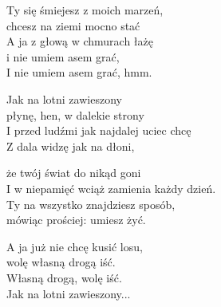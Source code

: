 \begin{text}
    Ty się śmiejesz z moich marzeń,\\
    chcesz na ziemi mocno stać\\
    A ja z głową w chmurach łażę\\
    i nie umiem asem grać,\\
    I nie umiem asem grać, hmm.

    Jak na lotni zawieszony\\
    płynę, hen, w dalekie strony\\
    I przed ludźmi jak najdalej uciec chcę\\
    Z dala widzę jak na dłoni,

    że twój świat do nikąd goni\\
    I w niepamięć wciąż zamienia każdy dzień.\\
    Ty na wszystko znajdziesz sposób,\\
    mówiąc prościej: umiesz żyć.

    A ja już nie chcę kusić losu,\\
    wolę własną drogą iść.\\
    Własną drogą, wolę iść.\\
    Jak na lotni zawieszony...
\end{text}
\begin{chord}

\end{chord}